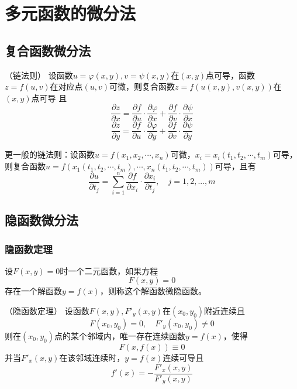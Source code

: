 \section{多元函数的微分法}
\subsection{复合函数微分法}

\begin{theorem}
    （链法则）
    \label{th:链法则}
    设函数$u=\varphi(x,y),v=\psi(x,y)$在$(x,y)$点可导，函数$z=f(u,v)$在对应点$(u,v)$可微，则复合函数$z=f(u(x,y),v(x,y))$在$(x,y)$点可导
    且
    \[
        \frac{\partial z}{\partial x} = \frac{\partial f}{\partial u}\cdot\frac{\partial\varphi}{\partial x} + \frac{\partial f}{\partial v}\cdot\frac{\partial\psi}{\partial x}
    \]
    \[
        \frac{\partial z}{\partial y} = \frac{\partial f}{\partial u}\cdot\frac{\partial\varphi}{\partial y} + \frac{\partial f}{\partial v}\cdot\frac{\partial\psi}{\partial y}
    \]
\end{theorem}

\begin{theorem}
    更一般的链法则：设函数$u=f(x_1,x_2,\cdots,x_n)$可微，$x_i=x_i(t_1,t_2,\cdots,t_m)$可导，则复合函数$u=f(x_1(t_1,t_2,\cdots,t_m),\cdots,x_n(t_1,t_2,\cdots,t_m))$可导，且有
    \[
        \frac{\partial u}{\partial t_j} = \sum_{i=1}^n \frac{\partial f}{\partial x_i}\cdot\frac{\partial x_i}{\partial t_j}, \quad j = 1,2,...,m
    \]
\end{theorem}

\subsection{隐函数微分法}
\subsubsection{隐函数定理}
设$F(x,y)=0$时一个二元函数，如果方程
\[ F(x,y) = 0 \]
存在一个解函数$y=f(x)$，则称这个解函数微隐函数。
\begin{theorem}
    （隐函数定理）
    \label{th:隐函数定理}
    设函数$F(x,y),F'_y(x,y)$在$(x_0,y_0)$附近连续且
    \[ F(x_0,y_0) = 0, \quad F'_y(x_0,y_0)\neq 0 \]
    则在$(x_0,y_0)$点的某个邻域内，唯一存在连续函数$y=f(x)$，使得
    \[ F(x,f(x)) \equiv 0 \]
    并当$F'_x(x,y)$在该邻域连续时，$y=f(x)$连续可导且
    \[ f'(x) = - \frac{F'_x(x,y)}{F'_y(x,y)} \]
\end{theorem}

